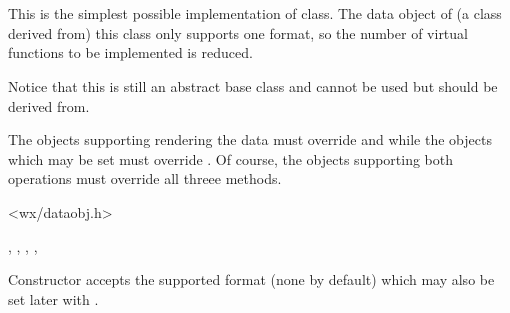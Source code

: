 
\section{}\label{wxdataobjectsimple}

This is the simplest possible implementation of 
 class. The data object of (a class derived
from) this class only supports one format, so the number of virtual functions
to be implemented is reduced.

Notice that this is still an abstract base class and cannot be used but should
be derived from.


The objects supporting rendering the data must override 
 and 
 while the objects which
may be set must override . Of
course, the objects supporting both operations must override all threee
methods.




<wx/dataobj.h>


, 
, 
, 
, 


\label{wxdataobjectsimplewxdataobjectsimple}


Constructor accepts the supported format (none by default) which may also be
set later with .

